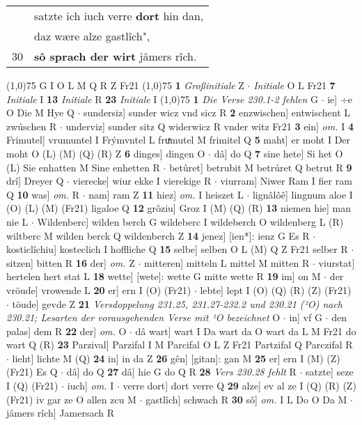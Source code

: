 \documentclass[8pt,a4paper,notitlepage]{article}
\begin{document}
\begin{table}[ht]
\begin{minipage}[t]{0.5\linewidth}
\begin{tabular}{rl}
 & satzte ich iuch verre \textbf{dort} hin dan,\\ 
 & daz wære alze gastlîch",\\ 
30 & \textbf{sô sprach der wirt} jâmers rîch.\\ 
\end{tabular}
\scriptsize
\line(1,0){75} \newline
G I O L M Q R Z Fr21 \newline
\line(1,0){75} \newline
\textbf{1} \textit{Großinitiale} Z   $\cdot$ \textit{Initiale} O L Fr21  \textbf{7} \textit{Initiale} I  \textbf{13} \textit{Initiale} R  \textbf{23} \textit{Initiale} I  \newline
\line(1,0){75} \newline
\textbf{1} \textit{Die Verse 230.1-2 fehlen} G   $\cdot$ ie] ÷e O Die M Hye Q  $\cdot$ sundersiz] sunder wicz vnd sicz R \textbf{2} enzwischen] entwischent L zwúschen R  $\cdot$ underviz] sunder sitz Q widerwicz R vnder witz Fr21 \textbf{3} ein] \textit{om.} I \textbf{4} Frimutel] vrumuntel I Frýmvntel L fruͯmutel M frimitel Q \textbf{5} maht] er moht I Der moht O (L) (M) (Q) (R) Z \textbf{6} dinges] dingen O  $\cdot$ dâ] do Q \textbf{7} sine hete] Si het O (L) Sie enhatten M Sine enhetten R  $\cdot$ betûret] betrubit M betrúret Q betrut R \textbf{9} drî] Dreyer Q  $\cdot$ vierecke] wiur ekke I vierekige R  $\cdot$ viurram] Niwer Ram I fier ram Q \textbf{10} was] \textit{om.} R  $\cdot$ nam] ram Z \textbf{11} hiez] \textit{om.} I heiszet L  $\cdot$ lignâlôê] lingnum aloe I (O) (L) (M) (Fr21) ligaloe Q \textbf{12} grôziu] Groz I (M) (Q) (R) \textbf{13} niemen hie] man nie L  $\cdot$ Wildenberc] wilden berch G wildeberc I wildeberch O wildenberg L (R) wiltberc M wilden berck Q wildenberch Z \textbf{14} jenez] [ien*]: ienz G Es R  $\cdot$ kosticlîchiu] kosteclich I hoffliche Q \textbf{15} selbe] selben O L (M) Q Z Fr21 selber R  $\cdot$ sitzen] bitten R \textbf{16} der] \textit{om.} Z  $\cdot$ mitteren] mitteln L mittel M mitten R  $\cdot$ viurstat] hertelen hert stat L \textbf{18} wette] [wete]: wette G mitte wette R \textbf{19} im] on M  $\cdot$ der vröude] vrowende L \textbf{20} er] ern I (O) (Fr21)  $\cdot$ lebte] lept I (O) (Q) (R) (Z) (Fr21)  $\cdot$ töude] gevde Z \textbf{21} \textit{Versdoppelung 231.25, 231.27-232.2 und 230.21 (²O) nach 230.21; Lesarten der vorausgehenden Verse mit ¹O bezeichnet} O   $\cdot$ in] vf G  $\cdot$ den palas] dem R \textbf{22} der] \textit{om.} O  $\cdot$ dâ wart] wart I Da wart da O wart da L M Fr21 do wart Q (R) \textbf{23} Parzival] Parzifal I M Parcifal O L Z Fr21 Partzifal Q Parczifal R  $\cdot$ lieht] lichte M (Q) \textbf{24} in] in da Z \textbf{26} gên] [gitan]: gan M \textbf{25} er] ern I (M) (Z) (Fr21) Es Q  $\cdot$ dâ] do Q \textbf{27} dâ] hie G do Q R \textbf{28} \textit{Vers 230.28 fehlt} R   $\cdot$ satzte] seze I (Q) (Fr21)  $\cdot$ iuch] \textit{om.} I  $\cdot$ verre dort] dort verre Q \textbf{29} alze] ev al ze I (Q) (R) (Z) (Fr21) iv gar ze O allen zcu M  $\cdot$ gastlîch] schwach R \textbf{30} sô] \textit{om.} I L Do O Da M  $\cdot$ jâmers rîch] Jamersach R \newline

\end{minipage}
\end{table}
\end{document}
